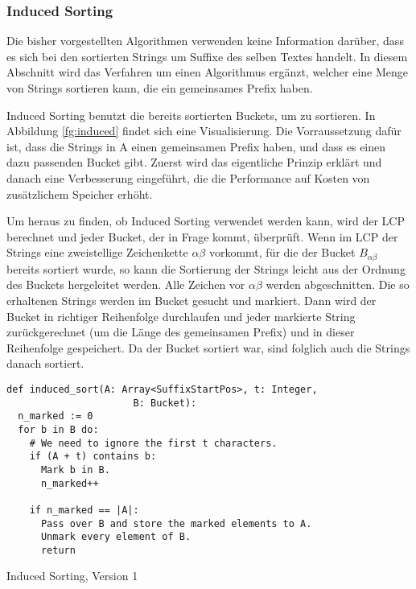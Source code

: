 \subsubsection{Induced Sorting}
Die bisher vorgestellten Algorithmen verwenden keine Information darüber, dass es sich bei den sortierten Strings um Suffixe des selben Textes handelt.
In diesem Abschnitt wird das Verfahren um einen Algorithmus ergänzt, welcher eine Menge von Strings sortieren kann, die ein gemeinsames Prefix haben.

Induced Sorting benutzt die bereits sortierten Buckets, um zu sortieren.
In Abbildung \ref{fg:induced} findet sich eine Visualisierung.
Die Vorraussetzung dafür ist, dass die Strings in A einen gemeinsamen Prefix haben,
und dass es einen dazu passenden Bucket gibt.
Zuerst wird das eigentliche Prinzip erklärt und danach eine Verbesserung eingeführt,
die die Performance auf Kosten von zusätzlichem Speicher erhöht.

Um heraus zu finden, ob Induced Sorting verwendet werden kann, wird der LCP berechnet und jeder Bucket, der in Frage kommt, überprüft.
Wenn im LCP der Strings eine zweistellige Zeichenkette $\alpha\beta$ vorkommt,
für die der Bucket $B_{\alpha\beta}$ bereits sortiert wurde,
so kann die Sortierung der Strings leicht aus der Ordnung des Buckets hergeleitet werden.
Alle Zeichen vor $\alpha\beta$ werden abgeschnitten.
Die so erhaltenen Strings werden im Bucket gesucht und markiert.
Dann wird der Bucket in richtiger Reihenfolge durchlaufen und jeder markierte String
zurückgerechnet (um die Länge des gemeinsamen Prefix) und in dieser Reihenfolge gespeichert.
Da der Bucket sortiert war, sind folglich auch die Strings danach sortiert.

\begin{listing}[!t]
\begin{verbatim}
def induced_sort(A: Array<SuffixStartPos>, t: Integer,
                      B: Bucket):
  n_marked := 0
  for b in B do:
    # We need to ignore the first t characters.
    if (A + t) contains b:
      Mark b in B.
      n_marked++

    if n_marked == |A|:
      Pass over B and store the marked elements to A.
      Unmark every element of B.
      return
\end{verbatim}
\caption{Induced Sorting, Version 1~\cite{saca:4}}
\end{listing}

